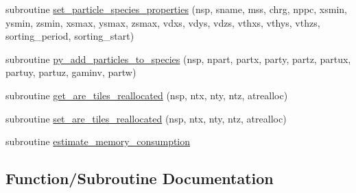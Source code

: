 \begin{DoxyCompactItemize}
\item 
subroutine \hyperlink{namespacetiling_a832a380c64af7fb0611b3528b1b28ef2}{set\+\_\+particle\+\_\+species\+\_\+properties} (nsp, sname, mss, chrg, nppc, xsmin, ysmin, zsmin, xsmax, ysmax, zsmax, vdxs, vdys, vdzs, vthxs, vthys, vthzs, sorting\+\_\+period, sorting\+\_\+start)
\item 
subroutine \hyperlink{namespacetiling_a7d2954e264909ff996bff6096932a53d}{py\+\_\+add\+\_\+particles\+\_\+to\+\_\+species} (nsp, npart, partx, party, partz,                                                       partux, partuy, partuz, gaminv, partw)
\item 
subroutine \hyperlink{namespacetiling_a74f93e807809bce73965e51431a8f8c7}{get\+\_\+are\+\_\+tiles\+\_\+reallocated} (nsp, ntx, nty, ntz, atrealloc)
\item 
subroutine \hyperlink{namespacetiling_a9ac073551919a3ca368f58e56b9370e6}{set\+\_\+are\+\_\+tiles\+\_\+reallocated} (nsp, ntx, nty, ntz, atrealloc)
\item 
subroutine \hyperlink{namespacetiling_a535146a13d8c0743eba14d150ca49199}{estimate\+\_\+memory\+\_\+consumption}
\end{DoxyCompactItemize}


\subsection{Function/\+Subroutine Documentation}
